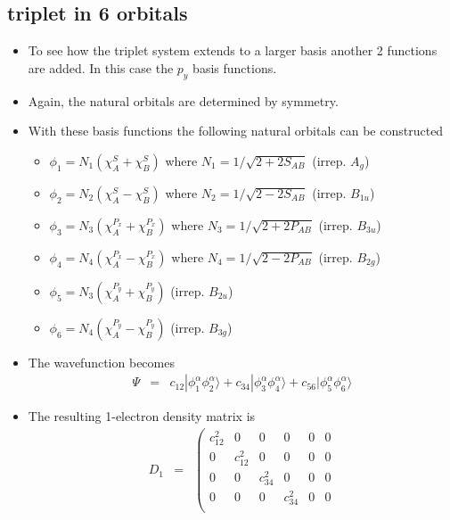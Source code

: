 \documentclass[aip,graphicx]{revtex4-1}
\begin{document}
\subsection{triplet  in 6 orbitals}

\begin{itemize}
\item To see how the triplet system extends to a larger basis another 2 functions are added. In this case the $p_y$ basis functions.
\item Again, the natural orbitals are determined by symmetry. 
\item With these basis functions the following natural orbitals can be constructed
         \begin{itemize}
         \item $\phi_1 = N_1 \left(\chi_A^S + \chi_B^S\right)$ where $N_1 = 1/\sqrt{2+2S_{AB}}$ (irrep. $A_g$)
         \item $\phi_2 = N_2 \left(\chi_A^S - \chi_B^S\right)$ where $N_2 = 1/\sqrt{2-2S_{AB}}$ (irrep. $B_{1u}$)
         \item $\phi_3 = N_3 \left(\chi_A^{P_x} + \chi_B^{P_x}\right)$ where $N_3 = 1/\sqrt{2+2P_{AB}}$ (irrep. $B_{3u}$)
         \item $\phi_4 = N_4 \left(\chi_A^{P_x} - \chi_B^{P_x}\right)$ where $N_4 = 1/\sqrt{2-2P_{AB}}$ (irrep. $B_{2g}$)
         \item $\phi_5 = N_3 \left(\chi_A^{P_y} + \chi_B^{P_y}\right)$  (irrep. $B_{2u}$)
         \item $\phi_6 = N_4 \left(\chi_A^{P_y} - \chi_B^{P_y}\right)$  (irrep. $B_{3g}$)
         \end{itemize}
\item The wavefunction becomes
         \begin{eqnarray}
         \Psi &=& c_{12}|\phi^\alpha_1\phi^\alpha_2\rangle + c_{34}|\phi^\alpha_3\phi^\alpha_4\rangle +
         c_{56}|\phi^\alpha_5\phi^\alpha_6\rangle
        \end{eqnarray}
\item The resulting 1-electron density matrix is
         \begin{eqnarray}
         D_{1} &=&
         \left(\begin{matrix}
         c_{12}^2 & 0 & 0 & 0 & 0 & 0 \\
         0 & c_{12}^2 & 0 & 0 & 0 & 0 \\
         0 & 0 & c_{34}^2 & 0 & 0 & 0 \\
         0 & 0 & 0 & c_{34}^2 & 0 & 0 \\

\end{matrix}
\end{eqnarray}
\end{itemize}
\end{document}
